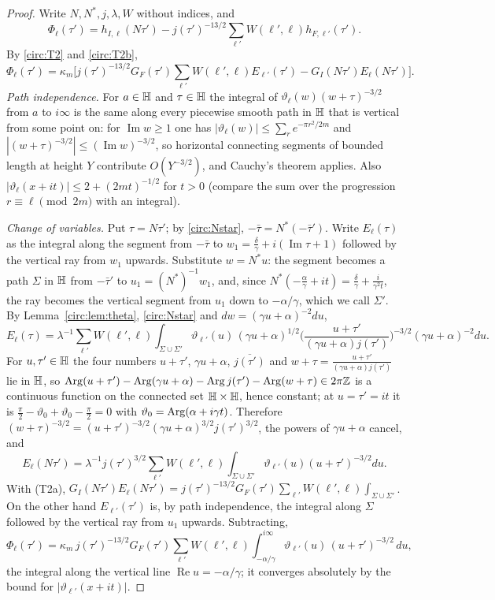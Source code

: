 \begin{proof}
Write $N,N^*,j,\lambda,W$ without indices, and
\[
\Phi_\ell(\tau')=h_{I,\ell}(N\tau')-j(\tau')^{-13/2}\sum_{\ell'}W(\ell',\ell)h_{F,\ell'}(\tau').
\]
By \eqref{circ:T2} and \eqref{circ:T2b},
\[
\Phi_\ell(\tau')=\kappa_m\Big[j(\tau')^{-13/2}G_F(\tau')\sum_{\ell'}W(\ell',\ell)E_{\ell'}(\tau')-G_I(N\tau')E_\ell(N\tau')\Big].
\]
\emph{Path independence.} For $a\in\mathbb{H}$ and $\tau\in\mathbb{H}$ the integral of $\vartheta_\ell(w)(w+\tau)^{-3/2}$ from $a$ to $i\infty$ is the same along every piecewise smooth path in $\mathbb{H}$ that is vertical from some point on: for $\operatorname{Im}w\ge1$ one has $|\vartheta_\ell(w)|\le\sum_r e^{-\pi r^2/2m}$ and $|(w+\tau)^{-3/2}|\le(\operatorname{Im}w)^{-3/2}$, so horizontal connecting segments of bounded length at height $Y$ contribute $O(Y^{-3/2})$, and Cauchy's theorem applies. Also $|\vartheta_\ell(x+it)|\le2+(2mt)^{-1/2}$ for $t>0$ (compare the sum over the progression $r\equiv\ell\pmod{2m}$ with an integral).

\emph{Change of variables.} Put $\tau=N\tau'$; by \eqref{circ:Nstar}, $-\bar\tau=N^*(-\bar\tau')$. Write $E_\ell(\tau)$ as the integral along the segment from $-\bar\tau$ to $w_1=\frac\delta\gamma+i(\operatorname{Im}\tau+1)$ followed by the vertical ray from $w_1$ upwards. Substitute $w=N^*u$: the segment becomes a path $\Sigma$ in $\mathbb{H}$ from $-\bar\tau'$ to $u_1=(N^*)^{-1}w_1$, and, since $N^*(-\frac\alpha\gamma+it)=\frac\delta\gamma+\frac i{\gamma^2t}$, the ray becomes the vertical segment from $u_1$ down to $-\alpha/\gamma$, which we call $\Sigma'$. By Lemma~\ref{circ:lem:theta}, \eqref{circ:Nstar} and $dw=(\gamma u+\alpha)^{-2}du$,
\[
E_\ell(\tau)=\lambda^{-1}\sum_{\ell'}W(\ell',\ell)\int_{\Sigma\cup\Sigma'}\vartheta_{\ell'}(u)\,(\gamma u+\alpha)^{1/2}\Big(\frac{u+\tau'}{(\gamma u+\alpha)j(\tau')}\Big)^{-3/2}(\gamma u+\alpha)^{-2}du .
\]
For $u,\tau'\in\mathbb{H}$ the four numbers $u+\tau'$, $\gamma u+\alpha$, $\overline{j(\tau')}$ and $w+\tau=\frac{u+\tau'}{(\gamma u+\alpha)j(\tau')}$ lie in $\mathbb{H}$, so $\operatorname{Arg}(u+\tau')-\operatorname{Arg}(\gamma u+\alpha)-\operatorname{Arg} j(\tau')-\operatorname{Arg}(w+\tau)\in2\pi\mathbb{Z}$ is a continuous function on the connected set $\mathbb{H}\times\mathbb{H}$, hence constant; at $u=\tau'=it$ it is $\frac\pi2-\vartheta_0+\vartheta_0-\frac\pi2=0$ with $\vartheta_0=\operatorname{Arg}(\alpha+i\gamma t)$. Therefore $(w+\tau)^{-3/2}=(u+\tau')^{-3/2}(\gamma u+\alpha)^{3/2}j(\tau')^{3/2}$, the powers of $\gamma u+\alpha$ cancel, and
\[
E_\ell(N\tau')=\lambda^{-1}j(\tau')^{3/2}\sum_{\ell'}W(\ell',\ell)\int_{\Sigma\cup\Sigma'}\vartheta_{\ell'}(u)(u+\tau')^{-3/2}du .
\]
With (T2a), $G_I(N\tau')E_\ell(N\tau')=j(\tau')^{-13/2}G_F(\tau')\sum_{\ell'}W(\ell',\ell)\int_{\Sigma\cup\Sigma'}$. On the other hand $E_{\ell'}(\tau')$ is, by path independence, the integral along $\Sigma$ followed by the vertical ray from $u_1$ upwards. Subtracting,
\begin{equation}\label{circ:period}
\Phi_\ell(\tau')=\kappa_m\,j(\tau')^{-13/2}G_F(\tau')\sum_{\ell'}W(\ell',\ell)\int_{-\alpha/\gamma}^{i\infty}\vartheta_{\ell'}(u)\,(u+\tau')^{-3/2}\,du,
\end{equation}
the integral along the vertical line $\operatorname{Re}u=-\alpha/\gamma$; it converges absolutely by the bound for $|\vartheta_{\ell'}(x+it)|$.


\end{proof}
